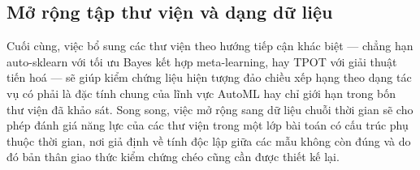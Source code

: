 \subsection{Mở rộng tập thư viện và dạng dữ liệu}
Cuối cùng, việc bổ sung các thư viện theo hướng tiếp cận khác biệt --- chẳng hạn
auto-sklearn với tối ưu Bayes kết hợp meta-learning, hay TPOT với giải thuật tiến
hoá --- sẽ giúp kiểm chứng liệu hiện tượng đảo chiều xếp hạng theo dạng tác vụ có
phải là đặc tính chung của lĩnh vực AutoML hay chỉ giới hạn trong bốn thư viện đã
khảo sát. Song song, việc mở rộng sang dữ liệu chuỗi thời gian sẽ cho phép đánh
giá năng lực của các thư viện trong một lớp bài toán có cấu trúc phụ thuộc thời
gian, nơi giả định về tính độc lập giữa các mẫu không còn đúng và do đó bản thân
giao thức kiểm chứng chéo cũng cần được thiết kế lại.
